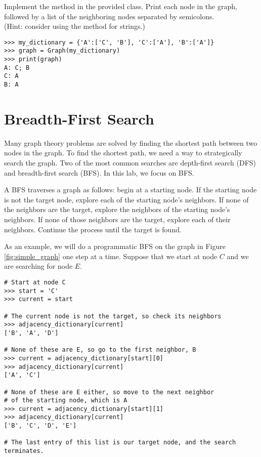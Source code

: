 \begin{problem}
Implement the  method in the provided  class.
Print each node in the graph, followed by a list of the neighboring nodes separated by semicolons.
\\(Hint: consider using the  method for strings.)

\begin{lstlisting}
>>> my_dictionary = {'A':['C', 'B'], 'C':['A'], 'B':['A']}
>>> graph = Graph(my_dictionary)
>>> print(graph)
A: C; B
C: A
B: A
\end{lstlisting}
\end{problem}

\section*{Breadth-First Search}

Many graph theory problems are solved by finding the shortest path between two nodes in the graph.
To find the shortest path, we need a way to strategically search the graph.
Two of the most common searches are depth-first search (DFS) and breadth-first search (BFS).
In this lab, we focus on BFS.

A BFS traverses a graph as follows: begin at a starting node.
If the starting node is not the target node, explore each of the starting node's neighbors.
If none of the neighbors are the target, explore the neighbors of the starting node's neighbors.
If none of those neighbors are the target, explore each of their neighbors.
Continue the process until the target is found.

As an example, we will do a programmatic BFS on the graph in Figure \ref{fig:simple_graph} one step at a time.
Suppose that we start at node $C$ and we are searching for node $E$.

\begin{lstlisting}
# Start at node C
>>> start = 'C'
>>> current = start

# The current node is not the target, so check its neighbors
>>> adjacency_dictionary[current]
['B', 'A', 'D']

# None of these are E, so go to the first neighbor, B
>>> current = adjacency_dictionary[start][0]
>>> adjacency_dictionary[current]
['A', 'C']

# None of these are E either, so move to the next neighbor
# of the starting node, which is A
>>> current = adjacency_dictionary[start][1]
>>> adjacency_dictionary[current]
['B', 'C', 'D', 'E']

# The last entry of this list is our target node, and the search terminates.
\end{lstlisting}

